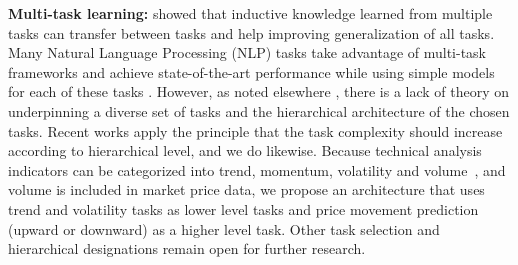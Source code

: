 \textbf{Multi-task learning:} 
showed that inductive knowledge learned from multiple tasks can
transfer between tasks and help improving generalization of all
tasks. Many Natural Language Processing (NLP) tasks take
advantage of multi-task frameworks and achieve state-of-the-art
performance while using simple models for each of these tasks
\cite{sogaard2016deep,hashimoto2016joint}. However, as noted elsewhere
\cite{caruana1993multitask,ruder2017overview}, there is a lack
of theory on underpinning a diverse set of tasks and the hierarchical
architecture of the chosen tasks. Recent works
\cite{sogaard2016deep,hashimoto2016joint} apply the principle
that the task complexity should increase according to
hierarchical level, and we do likewise. Because technical analysis indicators can be
categorized into trend, momentum, volatility and
volume~\cite{kirkpatrick2010technical}, and volume is included in
market price data, we propose an architecture that uses trend
and volatility tasks as lower level tasks and price movement
prediction (upward or downward) as a higher level task. Other
task selection and hierarchical designations remain open for
further research.



